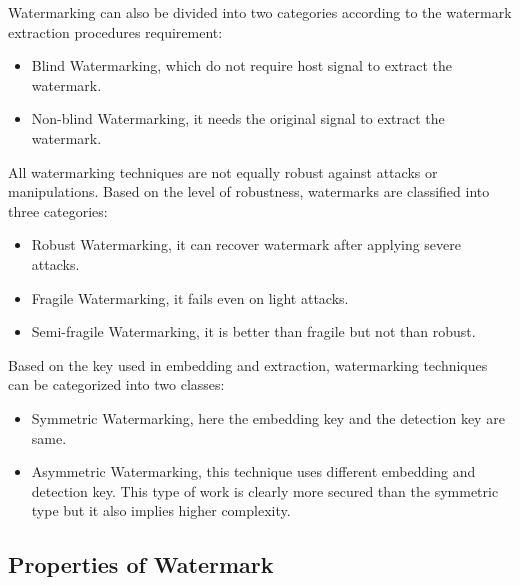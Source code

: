 \documentclass[12pt,a4paper]{report}
\begin{document}
\bigskip

Watermarking can also be divided into two categories according to the watermark extraction procedures requirement:

\begin{itemize}

\item Blind Watermarking, which do not require host signal to extract the watermark. 

\item Non-blind Watermarking, it needs the original signal to extract the watermark.

\end{itemize}

\bigskip

All watermarking techniques are not equally robust against attacks or manipulations. Based on the level of robustness, watermarks are classified into three categories:

\begin{itemize}

\item Robust Watermarking, it can recover watermark after applying severe attacks.
\item Fragile Watermarking, it fails even on light attacks.
\item Semi-fragile Watermarking, it is better than fragile but not than robust.

\end{itemize}

\bigskip

Based on the key used in embedding and extraction, watermarking techniques can be categorized into two classes:

\begin{itemize}

\item Symmetric Watermarking, here the embedding key and the detection key are same.

\item Asymmetric Watermarking, this technique uses different embedding and detection key. This type of work is clearly more secured than the symmetric type but it also implies higher complexity.

\end{itemize}


\subsection{Properties of Watermark}
\end{document}
